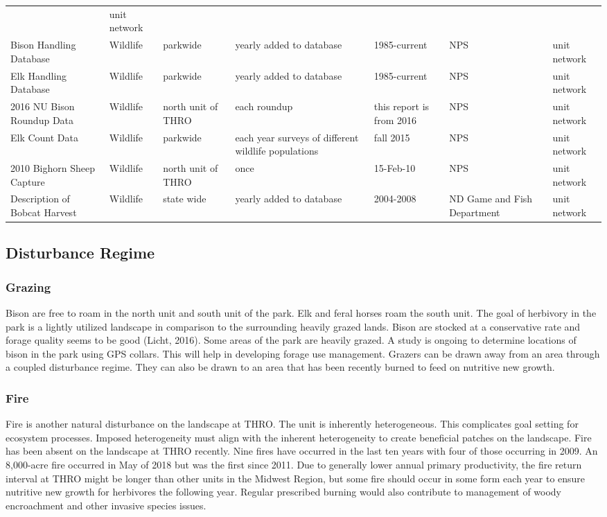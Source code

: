 \begin{longtable}[l]{@{}p{5cm}p{2cm}p{3cm}p{4cm}p{3cm}p{4cm}p{3cm}@{}}
& unit network\tabularnewline
Bison Handling Database & Wildlife & parkwide & yearly added to database
& 1985-current & NPS & unit network\tabularnewline
Elk Handling Database & Wildlife & parkwide & yearly added to database &
1985-current & NPS & unit network\tabularnewline
2016 NU Bison Roundup Data & Wildlife & north unit of THRO & each
roundup & this report is from 2016 & NPS & unit network\tabularnewline
Elk Count Data & Wildlife & parkwide & each year surveys of different
wildlife populations & fall 2015 & NPS & unit network\tabularnewline
2010 Bighorn Sheep Capture & Wildlife & north unit of THRO & once &
15-Feb-10 & NPS & unit network\tabularnewline
Description of Bobcat Harvest & Wildlife & state wide & yearly added to
database & 2004-2008 & ND Game and Fish Department & unit
network\tabularnewline
\bottomrule
\end{longtable}
\clearpage
\normalsetting
\pagestyle{fancy} 

\subsection{Disturbance Regime }

\subsubsection{Grazing }

Bison are free to roam in the north unit and south unit of the park. 
Elk and feral horses roam the south unit. 
The goal of herbivory in the park is a lightly utilized landscape in comparison to the surrounding heavily grazed lands. 
Bison are stocked at a conservative rate and forage quality seems to be good (Licht, 2016). 
Some areas of the park are heavily grazed. 
A study is ongoing to determine locations of bison in the park using GPS collars. 
This will help in developing forage use management. 
Grazers can be drawn away from an area through a coupled disturbance regime. 
They can also be drawn to an area that has been recently burned to feed on nutritive new growth.

\subsubsection{Fire }

Fire is another natural disturbance on the landscape at THRO. 
The unit is inherently heterogeneous. 
This complicates goal setting for ecosystem processes. 
Imposed heterogeneity must align with the inherent heterogeneity to create beneficial patches on the landscape. 
Fire has been absent on the landscape at THRO recently. 
Nine fires have occurred in the last ten years with four of those occurring in 2009. 
An 8,000-acre fire occurred in May of 2018 but was the first since 2011. 
Due to generally lower annual primary productivity, the fire return interval at THRO might be longer than other units in the Midwest Region, but some fire should occur in some form each year to ensure nutritive new growth for herbivores the following year. 
Regular prescribed burning would also contribute to management of woody encroachment and other invasive species issues.

